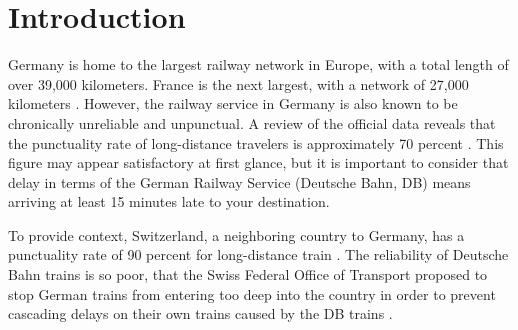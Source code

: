 \documentclass[12pt,a4paper]{article}
\title{\mytitle}
\author{Fabian Becker}
\date{\today}
\begin{document}
    
    
\maketitle

\begin{abstract}
  Although the German railway network is considered the largest in Europe, it is also infamous for being very unreliable. Since 70 percent of long-distance trains are considered to be not punctual, the German government introduced a railway spending programme with the aim of reducing delays and making the train a more desirable mode of transportation. In order for the spending programme to be successful, it is necessary to identify the factors that cause delays. In this paper, several of these factors will be shown, retrieved from a linear regression analysis. The study revealed that specific train station operators and control centers exert an influence on train delay, both positively and negatively. These insights can be employed to identify optimal train organisation strategies and implement them across the entire network. Furthermore, this research can serve as a foundation for identifying other crucial influences through the utilisation of a larger data set containing more information.
\end{abstract}

\section{\label{sec:Introduction}Introduction}

Germany is home to the largest railway network in Europe, with a total length of over 39,000 kilometers. France is the next largest, with a network of 27,000 kilometers \citep[p.~80]{RailwayLengthStat}. 
However, the railway service in Germany is also known to be chronically unreliable and unpunctual. 
A review of the official data reveals that the punctuality rate of long-distance travelers is approximately 70 percent \citep{dpa2023, DBPunctuality2024}. 
This figure may appear satisfactory at first glance, but it is important to consider that delay in terms of the German Railway Service (Deutsche Bahn, DB) means arriving at least 15 minutes late to your destination.

To provide context, Switzerland, a neighboring country to Germany, has a punctuality rate of 90 percent for long-distance train \citep{SBB2024}. 
The reliability of Deutsche Bahn trains is so poor, that the Swiss Federal Office of Transport proposed to stop German trains from entering too deep into the country in order to prevent cascading delays on their own trains  caused by the DB trains \citep{Magill2023}.
\end{document}
